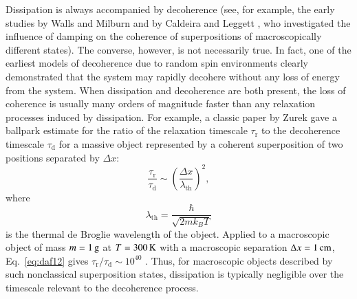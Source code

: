 \documentclass[3p,sort&compress]{elsarticle}
\begin{document}
Dissipation is always accompanied by decoherence (see, for example, the early studies by Walls and Milburn \cite{Walls:1985:pp} and by Caldeira and Leggett \cite{Caldeira:1985:tt}, who investigated  the influence of damping on the coherence of superpositions of macroscopically different states). The converse, however, is not necessarily true. In fact, one of the earliest models of decoherence due to random spin environments \cite{Zurek:1982:tv, Cucchietti:2005:om} clearly demonstrated that the system may rapidly decohere without any loss of energy from the system. When dissipation and decoherence are both present, the loss of coherence is usually many orders of magnitude faster than any relaxation processes induced by dissipation. For example, a classic paper by Zurek \cite{Zurek:1986:uz} gave a ballpark estimate for the ratio of the relaxation timescale $\tau_\text{r}$ to the decoherence timescale $\tau_\text{d}$ for a massive object represented by a coherent superposition of two positions separated by $\Delta x$:
%
\begin{equation}
  \label{eq:daf12}
  \frac{\tau_\text{r}}{\tau_\text{d}} \sim \left( \frac{\Delta
      x}{\lambda_\text{th}} \right)^2,
\end{equation}
%
where 
%
\begin{equation}
  \label{eq:daf12thermal}
\lambda_\text{th}=\frac{\hbar}{\sqrt{2mk_BT}}
\end{equation}
%
is the thermal de Broglie wavelength of the object. Applied to a macroscopic object of mass $m = \unit[1]{g}$ at $T=\unit[300]{K}$ with a macroscopic separation $\Delta x =\unit[1]{cm}$, Eq.~\eqref{eq:daf12} gives $\tau_\text{r}/\tau_\text{d} \sim10^{40}$ \cite{Zurek:1986:uz}. Thus, for macroscopic objects described by such nonclassical superposition states, dissipation is typically negligible over the timescale relevant to the decoherence process.
\end{document}
